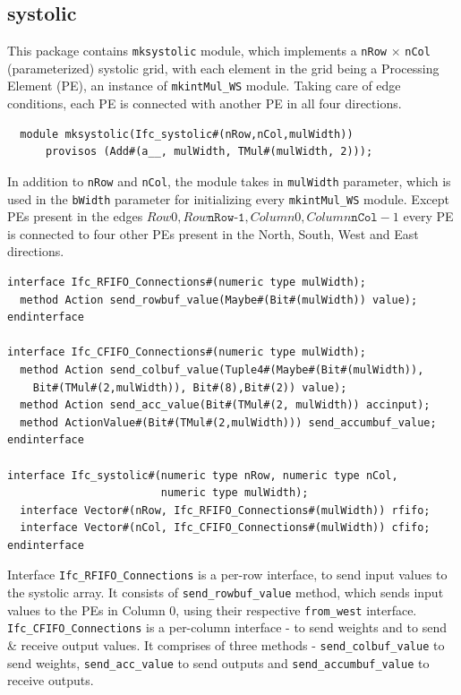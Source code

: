 \documentclass{article}
\begin{document}
\subsection{systolic}

This package contains \texttt{mksystolic} module, which implements a \texttt{nRow} $\times$ \texttt{nCol} (parameterized) systolic grid, with each element in the grid being a Processing Element (PE), an instance of \texttt{mkintMul\_WS} module. Taking care of edge conditions, each PE is connected with another PE in all four directions.

\begin{verbatim}
  module mksystolic(Ifc_systolic#(nRow,nCol,mulWidth))
      provisos (Add#(a__, mulWidth, TMul#(mulWidth, 2))); 
\end{verbatim}

In addition to \texttt{nRow} and \texttt{nCol}, the module takes in \texttt{mulWidth} parameter, which is used in the \texttt{bWidth} parameter for initializing every \texttt{mkintMul\_WS} module. Except PEs present in the edges \( Row 0, Row \texttt{nRow-1}, Column 0, Column \texttt{nCol}-1 \) every PE is connected to four other PEs present in the North, South, West and East directions. 

\begin{verbatim}
interface Ifc_RFIFO_Connections#(numeric type mulWidth);
  method Action send_rowbuf_value(Maybe#(Bit#(mulWidth)) value); 
endinterface

interface Ifc_CFIFO_Connections#(numeric type mulWidth);
  method Action send_colbuf_value(Tuple4#(Maybe#(Bit#(mulWidth)), 
    Bit#(TMul#(2,mulWidth)), Bit#(8),Bit#(2)) value);
  method Action send_acc_value(Bit#(TMul#(2, mulWidth)) accinput);
  method ActionValue#(Bit#(TMul#(2,mulWidth))) send_accumbuf_value;
endinterface

interface Ifc_systolic#(numeric type nRow, numeric type nCol,  
                        numeric type mulWidth);
  interface Vector#(nRow, Ifc_RFIFO_Connections#(mulWidth)) rfifo;
  interface Vector#(nCol, Ifc_CFIFO_Connections#(mulWidth)) cfifo;
endinterface
\end{verbatim}

Interface \texttt{Ifc\_RFIFO\_Connections} is a per-row interface, to send input values to the systolic array. It consists of  \texttt{send\_rowbuf\_value} method, which sends input values to the PEs in Column 0, using their respective \texttt{from\_west} interface. \texttt{Ifc\_CFIFO\_Connections} is a per-column interface - to send weights and to send \& receive output values. It comprises of three methods - \texttt{send\_colbuf\_value} to send weights, \texttt{send\_acc\_value} to send outputs and \texttt{send\_accumbuf\_value} to receive outputs.
\end{document}
